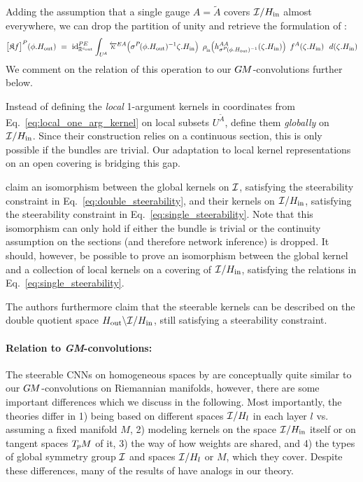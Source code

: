Adding the assumption that a single gauge $A = \widetilde{A}$ covers $\mathcal{I}/H_{\textup{in}}$ almost everywhere, we can drop the partition of unity and retrieve the formulation of \citet{Cohen2018-intertwiners}\cite{Cohen2019-generaltheory}:
\begin{align}
    \big[ \mathfrak{K} f \big]^P (\phi.\Hout)
    \ =\ \id_{\R^\cout}^{PE} \int_{U^{\!A}}
        \overleftarrow{\kappa} \rule{0pt}{0pt}^{\mkern-1mu EA} \pig( \sigma^P \mkern-2mu (\phi.\Hout)^{-1} \zeta.\Hin \pig)\,\ 
        \rhoin\pig( h_{\sigma^P \mkern-2mu (\phi.\Hout)^{-1}}^{AA} (\zeta.\Hin) \pig)\,\ 
        f^A (\zeta.\Hin)\ \ d(\zeta.\Hin)
\end{align}
We comment on the relation of this operation to our $G\mkern-1.4muM$-convolutions further below.


Instead of defining the \emph{local} 1-argument kernels in coordinates from Eq.~\eqref{eq:local_one_arg_kernel} on local subsets $U^{\widetilde{A}}$, \citet{Cohen2018-intertwiners}\cite{Cohen2019-generaltheory} define them \emph{globally} on~$\mathcal{I}/H_{\textup{in}}$.
Since their construction relies on a continuous section, this is only possible if the bundles are trivial.
Our adaptation to local kernel representations on an open covering is bridging this gap.


\citet{Cohen2018-intertwiners}\cite{Cohen2019-generaltheory} claim an isomorphism between the global kernels on $\mathcal{I}$,
satisfying the steerability constraint in Eq.~\eqref{eq:double_steerability},
and their kernels on $\mathcal{I}/H_{\textup{in}}$,
satisfying the steerability constraint in Eq.~\eqref{eq:single_steerability}.
Note that this isomorphism can only hold if
either the bundle is trivial
or the continuity assumption on the sections (and therefore network inference) is dropped.
It should, however, be possible to prove an isomorphism between the global kernel and a collection of local kernels on a covering of $\mathcal{I}/H_{\textup{in}}$, satisfying the relations in Eq.~\eqref{eq:single_steerability}.

The authors furthermore claim that the steerable kernels can be described on the double quotient space $H_{\textup{out}}\backslash \mathcal{I}/H_{\textup{in}}$, still satisfying a steerability constraint.






\paragraph{Relation to \textit{GM}-convolutions:}

The steerable CNNs on homogeneous spaces by \citet{Cohen2018-intertwiners}\cite{Cohen2019-generaltheory} are conceptually quite similar to our $G\mkern-1.4muM$-convolutions on Riemannian manifolds, however, there are some important differences which we discuss in the following.
Most importantly, the theories differ in
1) being based on different spaces $\mathcal{I}/H_l$ in each layer $l$ vs. assuming a fixed manifold $M$,
2) modeling kernels on the space $\mathcal{I}/H_{\textup{in}}$ itself or on tangent spaces $T_{\mkern-1.5mu p}\mkern-.5muM$ of it,
3) the way of how weights are shared, and
4) the types of global symmetry group $\mathcal{I}$ and spaces $\mathcal{I}/H_l$ or $M$, which they cover.
Despite these differences, many of the results of \citet{Cohen2018-intertwiners}\cite{Cohen2019-generaltheory} have analogs in our theory.

